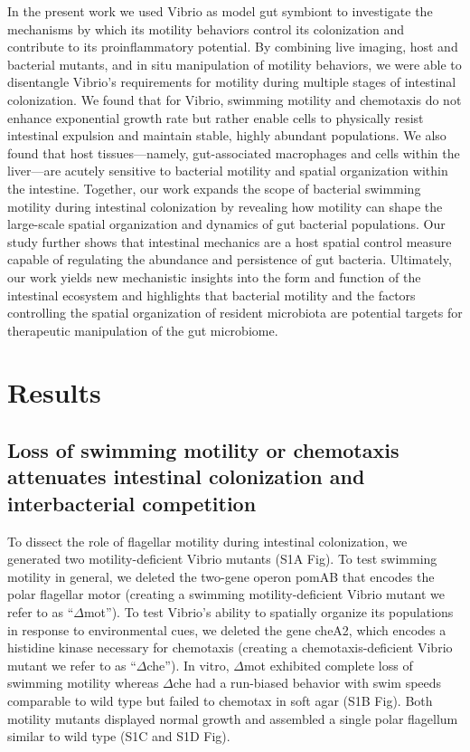 In the present work we used Vibrio as model gut symbiont to investigate the mechanisms by which its motility behaviors control its colonization and contribute to its proinflammatory potential. By combining live imaging, host and bacterial mutants, and in situ manipulation of motility behaviors, we were able to disentangle Vibrio's requirements for motility during multiple stages of intestinal colonization. We found that for Vibrio, swimming motility and chemotaxis do not enhance exponential growth rate but rather enable cells to physically resist intestinal expulsion and maintain stable, highly abundant populations. We also found that host tissues—namely, gut-associated macrophages and cells within the liver—are acutely sensitive to bacterial motility and spatial organization within the intestine. Together, our work expands the scope of bacterial swimming motility during intestinal colonization by revealing how motility can shape the large-scale spatial organization and dynamics of gut bacterial populations. Our study further shows that intestinal mechanics are a host spatial control measure capable of regulating the abundance and persistence of gut bacteria. Ultimately, our work yields new mechanistic insights into the form and function of the intestinal ecosystem and highlights that bacterial motility and the factors controlling the spatial organization of resident microbiota are potential targets for therapeutic manipulation of the gut microbiome.

\section{Results}

\subsection{Loss of swimming motility or chemotaxis attenuates intestinal colonization and interbacterial competition}
To dissect the role of flagellar motility during intestinal colonization, we generated two motility-deficient Vibrio mutants (S1A Fig). To test swimming motility in general, we deleted the two-gene operon pomAB that encodes the polar flagellar motor (creating a swimming motility-deficient Vibrio mutant we refer to as ``$\Delta$mot''). To test Vibrio's ability to spatially organize its populations in response to environmental cues, we deleted the gene cheA2, which encodes a histidine kinase necessary for chemotaxis (creating a chemotaxis-deficient Vibrio mutant we refer to as ``$\Delta$che''). In vitro, $\Delta$mot exhibited complete loss of swimming motility whereas $\Delta$che had a run-biased behavior with swim speeds comparable to wild type but failed to chemotax in soft agar (S1B Fig). Both motility mutants displayed normal growth and assembled a single polar flagellum similar to wild type (S1C and S1D Fig). 

